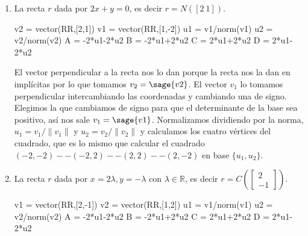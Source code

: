 \documentclass{amsart}
\begin{document}
\begin{enumerate}
\item La recta $r$ dada por $2x+y = 0$, es decir $r = N([2\ 1])$.

\begin{sageblock}
v2 = vector(RR,[2,1])
v1 = vector(RR,[1,-2])
u1 = v1/norm(v1)
u2 = v2/norm(v2)
A = -2*u1-2*u2
B = -2*u1+2*u2
C =  2*u1+2*u2
D =  2*u1-2*u2
\end{sageblock}

El vector perpendicular a la recta nos lo dan porque la recta nos la dan en implícitas
por lo que tomamos $v_2 = \sage{v2}$. El vector $v_1$ lo tomamos perpendicular intercambiando
las coordenadas y cambiando una de signo. Elegimos la que cambiamos de signo para que el determinante
de la base sea positivo, así nos sale $v_1 = \sage{v1}$. Normalizamos dividiendo por la norma, 
$u_1 = v_1/\|v_1\|$ y $u_2 = v_2/\|v_2\|$ y calculamos
los cuatro vértices del cuadrado, que es lo mismo que calcular el cuadrado $(-2,-2) -- (-2,2) -- (2,2) -- (2,-2)$
en base $\{u_1,u_2\}$.


\begin{sagesub}
\begin{center}
\end{center}
\end{sagesub}

\item La recta $r$ dada por $x = 2\lambda, y = -\lambda$ con $\lambda \in {\mathbb R}$, es decir
$r = C\left(\left[\begin{array}{c} 2 \\ -1 \end{array} \right]\right)$.

\begin{sageblock}
v1 = vector(RR,[2,-1])
v2 = vector(RR,[1,2])
u1 = v1/norm(v1)
u2 = v2/norm(v2)
A = -2*u1-2*u2
B = -2*u1+2*u2
C =  2*u1+2*u2
D =  2*u1-2*u2
\end{sageblock}


\end{enumerate}
\end{document}
